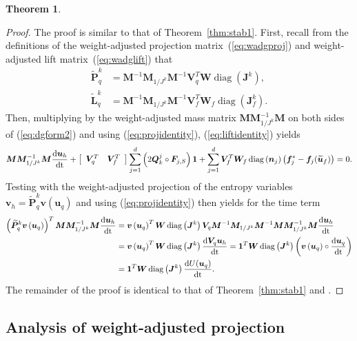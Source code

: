 \documentclass[preprint,10pt]{article}
\theoremstyle{definition}
\theoremstyle{lemma}
\theoremstyle{theorem}
\newtheorem{theorem}{Theorem}
\theoremstyle{assumption}
\DeclareMathOperator{\diag}{diag}
\renewcommand{\tilde}{\widetilde}
\newcommand{\td}[2]{\frac{{\rm d}#1}{{\rm d}{\rm #2}}}
\newcommand{\LRp}[1]{\left( #1 \right)}
\newcommand{\LRs}[1]{\left[ #1 \right]}
\begin{document}
{\begin{theorem}
\[\]
\label{thm:stab2}
\end{theorem}
\begin{proof}
The proof is similar to that of Theorem~\ref{thm:stab1}.  
First, recall from the definitions of the weight-adjusted projection matrix~(\ref{eq:wadgproj}) and weight-adjusted lift matrix~(\ref{eq:wadglift}) that
\begin{align}
\tilde{\bm{P}}^k_q &= \bm{M}^{-1}\bm{M}_{1/J^k} \bm{M}^{-1} \bm{V}_q^T \bm{W}  \diag\LRp{\bm{J}^k  }\label{eq:projidentity},\\
\tilde{\bm{L}}^k_q &= \bm{M}^{-1}\bm{M}_{1/J^k} \bm{M}^{-1} \bm{V}_f^T \bm{W}_f\diag\LRp{\bm{J}^k_f}\label{eq:liftidentity}.
\end{align}
Then, multiplying by the weight-adjusted mass matrix $\bm{M}\bm{M}_{1/J^k}^{-1}\bm{M}$ on both sides of (\ref{eq:dgform2}) and using (\ref{eq:projidentity}), (\ref{eq:liftidentity}) yields 
\[
\bm{M}\bm{M}_{1/J^k}^{-1}\bm{M}\td{\bm{u}_h}{t} + \LRs{\begin{array}{cc}{\bm{V}}_q^T & {\bm{V}}_f^T\end{array}}
\sum_{j=1}^d \LRp{2\bm{Q}^j_k \circ \bm{F}_{j,S}}\bm{1} + \sum_{j=1}^d {\bm{V}}_f^T\bm{W}_f \diag\LRp{\bm{n}_j}\LRp{\bm{f}_j^* - \bm{f}_j(\tilde{\bm{u}}_f)} = 0.
\]
Testing with the weight-adjusted projection of the entropy variables $\bm{v}_h = \tilde{\bm{P}}^k_q \bm{v}\LRp{\bm{u}_q}$ and using (\ref{eq:projidentity}) then yields for the time term
\begin{align*}
\LRp{\tilde{\bm{P}}^k_q \bm{v}\LRp{\bm{u}_q}}^T\bm{M}\bm{M}_{1/J^k}^{-1}\bm{M}\td{\bm{u}_h}{t} &= \bm{v}\LRp{\bm{u}_q}^T\bm{W}\diag\LRp{\bm{J}^k}\bm{V}_q \bm{M}^{-1}\bm{M}_{1/J^k} \bm{M}^{-1} \bm{M}\bm{M}_{1/J^k}^{-1}\bm{M}\td{\bm{u}_h}{t}\\
                                                                                               &= \bm{v}\LRp{\bm{u}_q}^T\bm{W}\diag\LRp{\bm{J}^k} \td{\bm{V}_q\bm{u}_h}{t} = \bm{1}^T\bm{W}\diag\LRp{\bm{J}^k} \left(\bm{v}\LRp{\bm{u}_q}\circ\td{\bm{u}_q}{t}\right) \\
                                                                                               &= \bm{1}^T\bm{W}\diag\LRp{\bm{J}^k} \td{U(\bm{u}_q)}{t}.
\end{align*}
The remainder of the proof is identical to that of Theorem~\ref{thm:stab1} and \cite{chan2017discretely}.
\end{proof}

\subsection{Analysis of weight-adjusted projection} 

}
\end{document}
